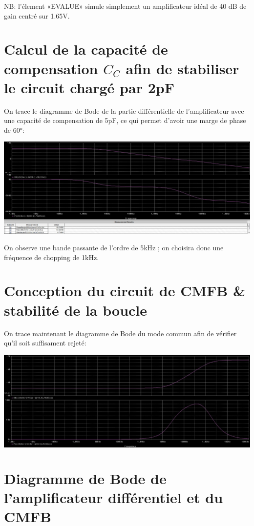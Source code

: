 \documentclass{article}
\begin{document}
NB: l’élement «EVALUE» simule simplement un amplificateur idéal de 40 dB de gain centré sur 1.65V.

\section{Calcul de la capacité de compensation $C_C$ afin de stabiliser le circuit chargé par 2pF}

On trace le diagramme de Bode de la partie différentielle de l’amplificateur avec une capacité de
compensation de 5pF, ce qui permet d’avoir une marge de phase de 60°:

\includegraphics[width=\linewidth]{bode_diff_2p_load.png}

On observe une bande passante de l’ordre de 5kHz ; on choisira donc une fréquence de chopping de 1kHz.

\section{Conception du circuit de CMFB \& stabilité de la boucle}

On trace maintenant le diagramme de Bode du mode commun afin de vérifier qu’il soit suffisament rejeté:

\includegraphics[width=\linewidth]{bode_mode_commun.png}

\newpage

\section{Diagramme de Bode de l’amplificateur différentiel et du CMFB}
\end{document}
